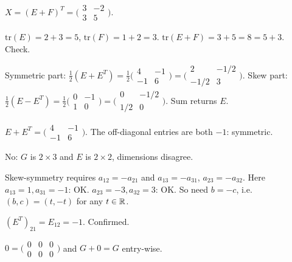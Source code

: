 \begin{solutions}
  \item $X = (E + F)^{T} = \bigl(\begin{smallmatrix} 3 & -2 \\ 3 & 5 \end{smallmatrix}\bigr)$.

  \item $\mathrm{tr}(E) = 2 + 3 = 5$, $\mathrm{tr}(F) = 1 + 2 = 3$. $\mathrm{tr}(E + F) = 3 + 5 = 8 = 5 + 3$. Check.

  \item Symmetric part: $\tfrac{1}{2}(E + E^{T}) = \tfrac{1}{2}\bigl(\begin{smallmatrix} 4 & -1 \\ -1 & 6 \end{smallmatrix}\bigr) = \bigl(\begin{smallmatrix} 2 & -1/2 \\ -1/2 & 3 \end{smallmatrix}\bigr)$. Skew part: $\tfrac{1}{2}(E - E^{T}) = \tfrac{1}{2}\bigl(\begin{smallmatrix} 0 & -1 \\ 1 & 0 \end{smallmatrix}\bigr) = \bigl(\begin{smallmatrix} 0 & -1/2 \\ 1/2 & 0 \end{smallmatrix}\bigr)$. Sum returns $E$.

  \item $E + E^{T} = \bigl(\begin{smallmatrix} 4 & -1 \\ -1 & 6 \end{smallmatrix}\bigr)$. The off-diagonal entries are both $-1$: symmetric.

  \item No: $G$ is $2 \times 3$ and $E$ is $2 \times 2$, dimensions disagree.

  \item Skew-symmetry requires $a_{12} = -a_{21}$ and $a_{13} = -a_{31}$, $a_{23} = -a_{32}$. Here $a_{13} = 1, a_{31} = -1$: OK. $a_{23} = -3, a_{32} = 3$: OK. So need $b = -c$, i.e.\ $(b, c) = (t, -t)$ for any $t \in \mathbb{R}$.

  \item $(E^{T})_{21} = E_{12} = -1$. Confirmed.

  \item $0 = \bigl(\begin{smallmatrix} 0 & 0 & 0 \\ 0 & 0 & 0 \end{smallmatrix}\bigr)$ and $G + 0 = G$ entry-wise.


\end{solutions}
